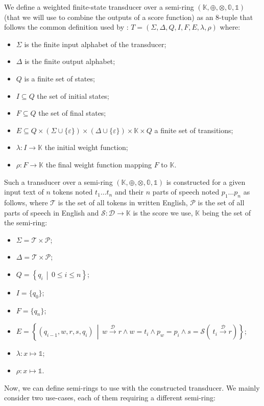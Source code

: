 \documentclass[a4paper, 11pt, onepage]{scrreprt}
\newcommand\maps[1]{\xrightarrow{\mathcal{#1}}}
\newcommand\suchthat{\, \middle| \,}
\begin{document}
We define a weighted finite-state transducer over a semi-ring
$(\mathbb{K}, \oplus, \otimes, \mathbb{0}, \mathbb{1})$ (that we will
use to combine the outputs of a score function) as an 8-tuple that
follows the common definition used by \cite{mohri2004weighted}: $T =
(\Sigma, \Delta, Q, I, F, E, \lambda, \rho)$ where:
\begin{itemize}
\item $\Sigma$ is the finite input alphabet of the transducer;
\item $\Delta$ is the finite output alphabet;
\item $Q$ is a finite set of states;
\item $I \subseteq Q$ the set of initial states;
\item $F \subseteq Q$ the set of final states;
\item $E \subseteq Q \times (\Sigma \cup \{\varepsilon\}) \times
  (\Delta \cup \{\varepsilon\}) \times \mathbb{K} \times Q$ a finite
  set of transitions;
\item $\lambda : I \rightarrow \mathbb{K}$ the initial weight function;
\item $\rho : F \rightarrow \mathbb{K}$ the final weight function mapping
  $F$ to $\mathbb{K}$.
\end{itemize}
Such a transducer over a semi-ring $(\mathbb{K}, \oplus, \otimes,
\mathbb{0}, \mathbb{1})$ is constructed for a given input text of $n$
tokens noted $t_1 \dots t_n$ and their $n$ parts of speech noted $p_1
\dots p_n$ as follows, where $\mathcal{T}$ is the set of all tokens in
written English, $\mathcal{P}$ is the set of all parts of speech in
English and $\mathcal{S} : \mathcal{D} \rightarrow \mathbb{K}$ is the
score we use, $\mathbb{K}$ being the set of the semi-ring:
\begin{itemize}
\item $\Sigma = \mathcal{T} \times \mathcal{P}$;
\item $\Delta = \mathcal{T} \times \mathcal{P}$;
\item $Q = \left\{ q_i \suchthat 0 \leq i \leq n \right\}$;
\item $I = \{ q_0 \}$;
\item $F = \{ q_n \}$;
\item $E = \left\{ (q_{i - 1}, w, r, s, q_i) \suchthat w \maps{D} r
    \land w = t_i \land p_w = p_i \land s = \mathcal{S}\left(\ t_i
      \maps{D} r \right)\right\}$;
\item $\lambda : x \mapsto \mathbb{1}$;
\item $\rho : x \mapsto \mathbb{1}$.
\end{itemize}
Now, we can define semi-rings to use with the constructed
transducer. We mainly consider two use-cases, each of them requiring a
different semi-ring:
\end{document}
